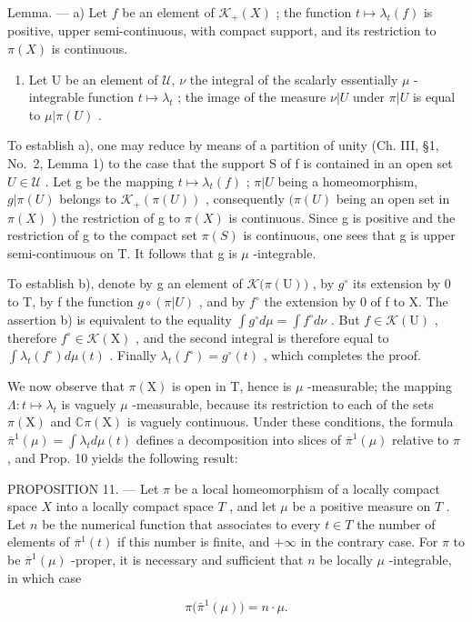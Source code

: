 Lemma. --- a) Let \(f\) be an element of \(\mathcal{K}_{+}(X)\) ; the function \(t \mapsto \lambda_{t}(f)\) is positive, upper semi-continuous, with compact support, and its restriction to \(\pi(X)\) is continuous.

\begin{enumerate}
\def\labelenumi{\alph{enumi})}
\setcounter{enumi}{1}
\tightlist
\item
  Let U be an element of \(\mathcal{U}\), \(\nu\) the integral of the scalarly essentially \(\mu\) -integrable function \(t \mapsto \lambda_{t}\) ; the image of the measure \(\nu|U\) under \(\pi|U\) is equal to \(\mu|\pi(U)\) .
\end{enumerate}

To establish a), one may reduce by means of a partition of unity (Ch. III, §1, No.~2, Lemma 1) to the case that the support S of f is contained in an open set \(U \in \mathcal{U}\) . Let g be the mapping \(t \mapsto \lambda_{t}(f)\) ; \(\pi|U\) being a homeomorphism, \(g|\pi(U)\) belongs to \(\mathcal{K}_{+}(\pi(U))\) , consequently \((\pi(U)\) being an open set in \(\pi(X)\) ) the restriction of g to \(\pi(X)\) is continuous. Since g is positive and the restriction of g to the compact set \(\pi(S)\) is continuous, one sees that g is upper semi-continuous on T. It follows that g is \(\mu\) -integrable.

To establish b), denote by g an element of \(\mathcal{K}\big(\pi(\mathrm{U})\big)\) , by \(g^{\circ}\) its extension by 0 to T, by f the function \(g \circ (\pi|U)\) , and by \(f^{\circ}\) the extension by 0 of f to X. The assertion b) is equivalent to the equality \(\int g^{\circ} d\mu = \int f^{\circ} d\nu\) . But \(f \in \mathcal{K}(\mathrm{U})\) , therefore \(f^{\circ} \in \mathcal{K}(\mathrm{X})\) , and the second integral is therefore equal to \(\int \lambda_{t}(f^{\circ}) d\mu(t)\) . Finally \(\lambda_{t}(f^{\circ}) = g^{\circ}(t)\) , which completes the proof.

We now observe that \(\pi(\mathrm{X})\) is open in T, hence is \(\mu\) -measurable; the mapping \(\Lambda: t \mapsto \lambda_t\) is vaguely \(\mu\) -measurable, because its restriction to each of the sets \(\pi(\mathrm{X})\) and \(\mathbb{C}\pi(\mathrm{X})\) is vaguely continuous. Under these conditions, the formula \(\overline{\pi}^{1}(\mu) = \int \lambda_t d\mu(t)\) defines a decomposition into slices of \(\overline{\pi}^{1}(\mu)\) relative to \(\pi\) , and Prop. 10 yields the following result:

PROPOSITION 11. --- Let \(\pi\) be a local homeomorphism of a locally compact space \(X\) into a locally compact space \(T\) , and let \(\mu\) be a positive measure on \(T\) . Let \(n\) be the numerical function that associates to every \(t \in T\) the number of elements of \(\overline{\pi}^{1}(t)\) if this number is finite, and \(+\infty\) in the contrary case. For \(\pi\) to be \(\overline{\pi}^{1}(\mu)\) -proper, it is necessary and sufficient that \(n\) be locally \(\mu\) -integrable, in which case

\[
\pi \big (\bar {\pi} ^ {1} (\mu) \big) = n \cdot \mu .\tag{15}
\]

